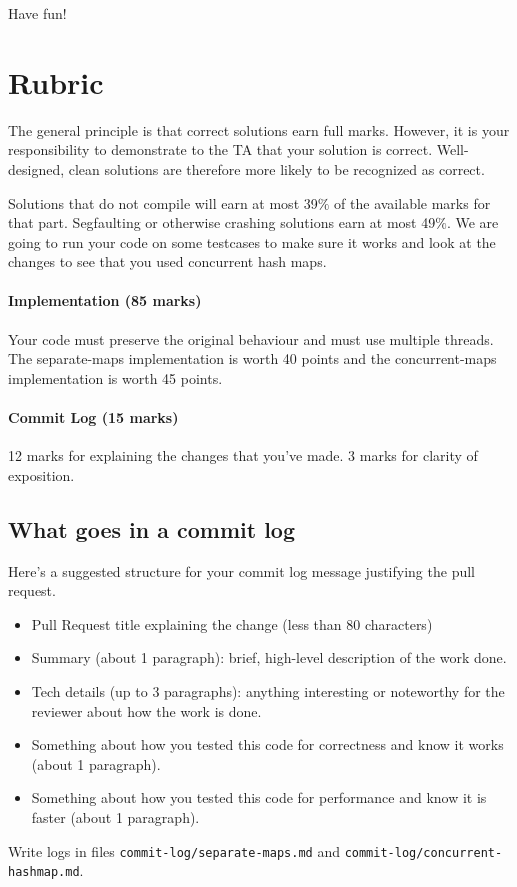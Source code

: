 \documentclass[12pt]{article}
\renewcommand{\_}{\kern-1.5pt\textunderscore\kern-1.5pt}
\begin{document}
Have fun!

\section*{Rubric}
The general principle is that correct solutions earn full marks. However, it is your responsibility to demonstrate to the TA that your solution is correct. Well-designed, clean solutions are therefore more likely to be recognized as correct. \par

Solutions that do not compile will earn at most 39$\%$  of the available marks for that part. Segfaulting or otherwise crashing solutions earn at most 49$\%$. We are going to run your code on some testcases to make sure it works and look at the changes to see that you used concurrent hash maps.

\paragraph{Implementation (85 marks)} Your code must preserve the original behaviour and must use multiple threads. The separate-maps implementation is worth 40 points and the concurrent-maps implementation is worth 45 points.

\paragraph{Commit Log (15 marks)} 12 marks for explaining the changes that you've made. 3 marks for clarity of exposition. 

\subsection*{What goes in a commit log}
Here's a suggested structure for your commit log message justifying the pull request.
\begin{itemize}
\item Pull Request title explaining the change (less than 80 characters)
\item Summary (about 1 paragraph): brief, high-level description of the work done.
\item Tech details (up to 3 paragraphs): anything interesting or noteworthy for the reviewer about how the work is done. 
\item Something about how you tested this code for correctness and know it works (about 1 paragraph).
\item Something about how you tested this code for performance and know it is faster (about 1 paragraph).
\end{itemize}
Write logs in files {\tt commit-log/separate-maps.md} and {\tt commit-log/concurrent-hashmap.md}.
\end{document}
